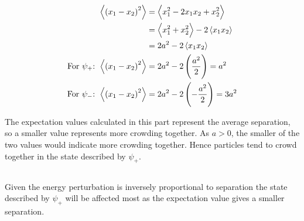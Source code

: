 \subsection{}
\begin{align*}
    \expectationvalue{\del{x_1 - x_2}^2} & = \expectationvalue{x_1^2 - 2 x_1 x_2 + x_2^2}\\
    & = \expectationvalue{x_1^2 + x_2^2} - 2 \expectationvalue{x_1 x_2}\\
    & = 2a^2 - 2 \expectationvalue{x_1 x_2}\\
    \textrm{For $ \psi_+ $: } \expectationvalue{\del{x_1 - x_2}^2} & = 2a^2 - 2 \del{\frac{a^2}{2}} = a^2\\
    \textrm{For $ \psi_- $: } \expectationvalue{\del{x_1 - x_2}^2} & = 2a^2 - 2 \del{- \frac{a^2}{2}} = 3a^2
\end{align*}

The expectation values calculated in this part represent the average separation, so a smaller value represents more crowding together. As $ a > 0 $, the smaller of the two values would indicate more crowding together. Hence particles tend to crowd together in the state described by $ \psi_+ $.

\subsection{}

Given the energy perturbation is inversely proportional to separation the state described by $ \psi_+ $ will be affected most as the expectation value gives a smaller separation.

